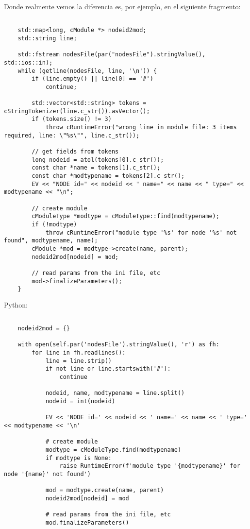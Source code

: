 Donde realmente vemos la diferencia es, por ejemplo, en el siguiente fragmento:

\begin{verbatim}

    std::map<long, cModule *> nodeid2mod;
    std::string line;

    std::fstream nodesFile(par("nodesFile").stringValue(), std::ios::in);
    while (getline(nodesFile, line, '\n')) {
        if (line.empty() || line[0] == '#')
            continue;

        std::vector<std::string> tokens = cStringTokenizer(line.c_str()).asVector();
        if (tokens.size() != 3)
            throw cRuntimeError("wrong line in module file: 3 items required, line: \"%s\"", line.c_str());

        // get fields from tokens
        long nodeid = atol(tokens[0].c_str());
        const char *name = tokens[1].c_str();
        const char *modtypename = tokens[2].c_str();
        EV << "NODE id=" << nodeid << " name=" << name << " type=" << modtypename << "\n";

        // create module
        cModuleType *modtype = cModuleType::find(modtypename);
        if (!modtype)
            throw cRuntimeError("module type '%s' for node '%s' not found", modtypename, name);
        cModule *mod = modtype->create(name, parent);
        nodeid2mod[nodeid] = mod;

        // read params from the ini file, etc
        mod->finalizeParameters();
    }
\end{verbatim}

Python:

\begin{verbatim}

    nodeid2mod = {}

    with open(self.par('nodesFile').stringValue(), 'r') as fh:
        for line in fh.readlines():
            line = line.strip()
            if not line or line.startswith('#'):
                continue

            nodeid, name, modtypename = line.split()
            nodeid = int(nodeid)

            EV << 'NODE id=' << nodeid << ' name=' << name << ' type=' << modtypename << '\n'

            # create module
            modtype = cModuleType.find(modtypename)
            if modtype is None:
                raise RuntimeError(f'module type '{modtypename}' for node '{name}' not found')

            mod = modtype.create(name, parent)
            nodeid2mod[nodeid] = mod

            # read params from the ini file, etc
            mod.finalizeParameters()

\end{verbatim}

